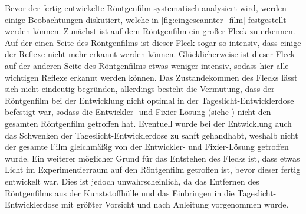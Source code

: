 Bevor der fertig entwickelte Röntgenfilm systematisch analysiert wird, werden einige Beobachtungen diskutiert, welche in \cref{fig:eingescannter_film} festgestellt werden können.
Zunächst ist auf dem Röntgenfilm ein großer Fleck zu erkennen. Auf der einen Seite des Röntgenfilms ist dieser Fleck sogar so intensiv, dass einige der Reflexe nicht mehr erkannt werden können.
Glücklicherweise ist dieser Fleck auf der anderen Seite des Röntgenfilms etwas weniger intensiv, sodass hier alle wichtigen Reflexe erkannt werden können. Das
Zustandekommen des Flecks lässt sich nicht eindeutig begründen, allerdings besteht die Vermutung, dass der Röntgenfilm bei der Entwicklung nicht optimal in der
Tageslicht-Entwicklerdose befestigt war, sodass die Entwickler- und Fixier-Lösung (siehe \cite{film_anleitung}) nicht den gesamten Röntgenfilm getroffen hat. Eventuell wurde
bei der Entwicklung auch das Schwenken der Tageslicht-Entwicklerdose zu sanft gehandhabt, weshalb nicht der gesamte Film gleichmäßig von der Entwickler- und Fixier-Lösung
getroffen wurde. Ein weiterer möglicher Grund für das Entstehen des Flecks ist, dass etwas Licht im Experimentierraum auf den Röntgenfilm getroffen ist, bevor dieser
fertig entwickelt war. Dies ist jedoch unwahrscheinlich, da das Entfernen des Röntgenfilms aus der Kunststoffhülle und das Einbringen in die Tageslicht-Entwicklerdose
mit größter Vorsicht und nach Anleitung vorgenommen wurde.\par
